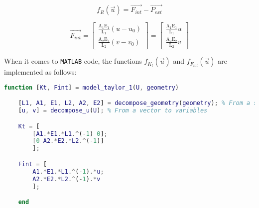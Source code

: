 \begin{equation}
    f_{R}(\vec{u}) = \vec{F_{int}} - \vec{P_{ext}}
    \label{eq:residual_vector_taylor_series_expansion_order_1}
\end{equation}

\begin{equation}
    \vec{F_{int}} =
    \begin{bmatrix}
        \frac{\text{A}_1 \text{E}_1}{\text{L}_1} \left( u - u_0 \right) \\
        \frac{\text{A}_2 \text{E}_2}{\text{L}_2} \left( v - v_0 \right)
    \end{bmatrix}
    =
    \begin{bmatrix}
        \frac{\text{A}_1 \text{E}_1}{\text{L}_1} u \\
        \frac{\text{A}_2 \text{E}_2}{\text{L}_2} v
    \end{bmatrix}
    \label{eq:internal_force_vector_taylor_series_expansion_order_1}
\end{equation}

When it comes to \texttt{MATLAB} code, the functions $f_{K_t}(\vec{u})$ and $f_{F_{int}}(\vec{u})$ are implemented as follows:

\begin{lstlisting}[language=Matlab]
    function [Kt, Fint] = model_taylor_1(U, geometry)

    [L1, A1, E1, L2, A2, E2] = decompose_geometry(geometry); % From a struct to variables
    [u, v] = decompose_u(U); % From a vector to variables

    Kt = [
        [A1.*E1.*L1.^(-1) 0];
        [0 A2.*E2.*L2.^(-1)]
        ];

    Fint = [
        A1.*E1.*L1.^(-1).*u;
        A2.*E2.*L2.^(-1).*v
        ];

    end
\end{lstlisting}
